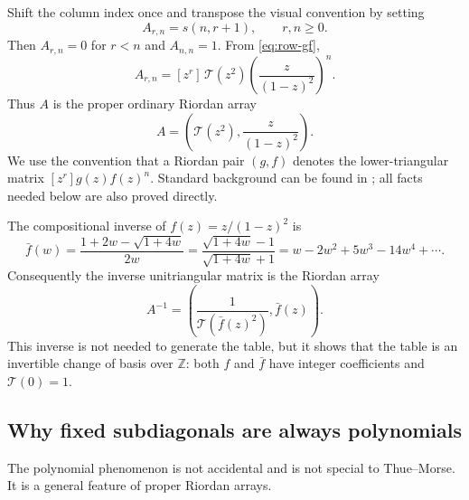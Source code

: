 \documentclass[11pt,oneside]{article}
\theoremstyle{definition}
\theoremstyle{remark}
\newcommand{\Z}{\mathbb Z}
\newcommand{\TM}{\mathcal T}
\newcommand{\coeff}[2]{[z^{#1}]\,#2}
\begin{document}
Shift the column index once and transpose the visual convention by setting
\begin{equation}
 A_{r,n}=s(n,r+1),
 \qquad r,n\ge0.
 \label{eq:A-definition}
\end{equation}
Then $A_{r,n}=0$ for $r<n$ and $A_{n,n}=1$.  From
\eqref{eq:row-gf},
\begin{equation}
 A_{r,n}
 =\coeff{r}{\TM(z^2)\left(\frac{z}{(1-z)^2}\right)^n}.
 \label{eq:riordan-entry}
\end{equation}
Thus $A$ is the proper ordinary Riordan array
\begin{equation}
 A=\left(\TM(z^2),\frac{z}{(1-z)^2}\right).
 \label{eq:riordan-pair}
\end{equation}
We use the convention that a Riordan pair $(g,f)$ denotes the lower-triangular
matrix $[z^r]g(z)f(z)^n$.  Standard background can be found in
\cite{riordan-group,sprugnoli}; all facts needed below are also proved
directly.

The compositional inverse of
$f(z)=z/(1-z)^2$ is
\begin{equation}
 \bar f(w)
 =\frac{1+2w-\sqrt{1+4w}}{2w}
 =\frac{\sqrt{1+4w}-1}{\sqrt{1+4w}+1}
 =w-2w^2+5w^3-14w^4+\cdots.
 \label{eq:f-inverse}
\end{equation}
Consequently the inverse unitriangular matrix is the Riordan array
\begin{equation}
 A^{-1}
 =\left(\frac{1}{\TM(\bar f(z)^2)},\bar f(z)\right).
 \label{eq:riordan-inverse}
\end{equation}
This inverse is not needed to generate the table, but it shows that the table
is an invertible change of basis over $\Z$: both $f$ and $\bar f$ have
integer coefficients and $\TM(0)=1$.

\subsection{Why fixed subdiagonals are always polynomials}

The polynomial phenomenon is not accidental and is not special to
Thue--Morse.  It is a general feature of proper Riordan arrays.
\end{document}
